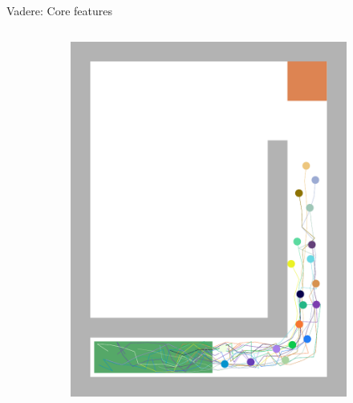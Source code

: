 \documentclass[compress,t,usenames,xcolor=dvipsnames]{beamer}
\begin{document}
\begin{frame}{Vadere: Core features \hfill \hyperlink{BackupSlides}{}}
\begin{columns}
\begin{column}{0.45\textwidth}
{\begin{figure}
                    \caption{Vadere GUI features}
                    \begin{subfigure}{0.475\textwidth}
                        \centering
                        \includegraphics[width=\textwidth]{VadereFeatures/Vadere-PostVisualization-ColoredAgents}
                    \end{subfigure}
                    \begin{subfigure}{0.475\textwidth}
                        \centering

\end{subfigure}
\end{figure}}
\end{column}
\end{columns}
\end{frame}
\end{document}
